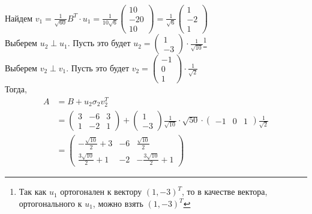 \documentclass[a4paper]{article}
\begin{document}
\indent Найдем $v_1=\displaystyle\frac{1}{\sqrt{60}}B^T\cdot u_1=\displaystyle\frac{1}{10\sqrt{6}}\begin{pmatrix}
    10\\
    -20\\
    10
\end{pmatrix}=\displaystyle\frac{1}{\sqrt{6}}\begin{pmatrix}
    1\\
    -2\\
    1
\end{pmatrix}$\\[2mm]
\indent Выберем $u_2\perp u_1$. Пусть это будет $u_2=\begin{pmatrix}
    1\\
    -3
\end{pmatrix}\cdot\displaystyle\frac{1}{\sqrt{10}}$\footnote{Так как $u_1$ ортогонален к вектору $(1, -3)^T$, то в качестве вектора, ортогонального к $u_1$, можно взять $(1, -3)^T$}\\[2mm]
\indent Выберем $v_2\perp v_1$. Пусть это будет $v_2=\begin{pmatrix}
    -1\\
    0\\
    1
\end{pmatrix}\cdot\displaystyle\frac{1}{\sqrt{2}}$\\[2mm]
\indent Тогда, $$\begin{aligned}A&=B+u_2\sigma_2 v_2^T\\
&=\begin{pmatrix}
            3&-6&3\\
            1&-2&1
        \end{pmatrix}+\begin{pmatrix}
            1\\
            -3
        \end{pmatrix}\displaystyle\frac{1}{\sqrt{10}}\cdot\sqrt{50}\cdot\begin{pmatrix}
            -1&0&1
        \end{pmatrix}\displaystyle\frac{1}{\sqrt{2}}\\
        &=\boxed{\begin{pmatrix}
            -\frac{\sqrt{10}}{2}+3&-6&\frac{\sqrt{10}}{2}\\[1mm]
            \frac{3\sqrt{10}}{2}+1&-2&-\frac{3\sqrt{10}}{2}+1
        \end{pmatrix}}
        \end{aligned}$$


\newpage
\end{document}
